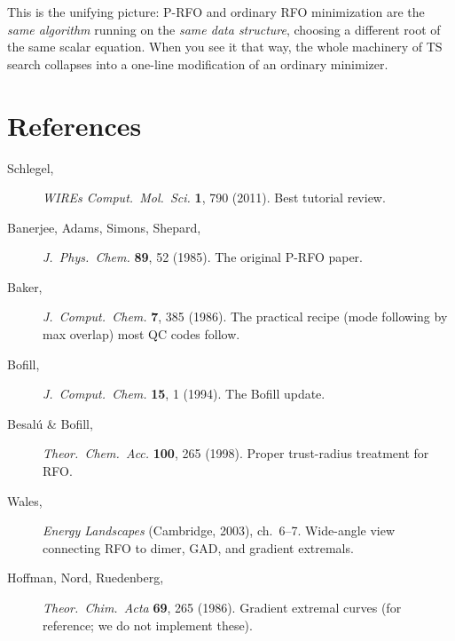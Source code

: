 \documentclass[11pt]{article}
\begin{document}
This is the unifying picture: P-RFO and ordinary RFO minimization are the
\emph{same algorithm} running on the \emph{same data structure}, choosing a
different root of the same scalar equation.  When you see it that way, the
whole machinery of TS search collapses into a one-line modification of an
ordinary minimizer.

\section*{References}

\begin{description}
\item[Schlegel,] \emph{WIREs Comput.\ Mol.\ Sci.} \textbf{1}, 790 (2011).
      Best tutorial review.
\item[Banerjee, Adams, Simons, Shepard,] \emph{J.\ Phys.\ Chem.} \textbf{89},
      52 (1985).  The original P-RFO paper.
\item[Baker,] \emph{J.\ Comput.\ Chem.} \textbf{7}, 385 (1986).  The
      practical recipe (mode following by max overlap) most QC codes follow.
\item[Bofill,] \emph{J.\ Comput.\ Chem.} \textbf{15}, 1 (1994).  The Bofill
      update.
\item[Besal\'u \& Bofill,] \emph{Theor.\ Chem.\ Acc.} \textbf{100}, 265
      (1998).  Proper trust-radius treatment for RFO.
\item[Wales,] \emph{Energy Landscapes} (Cambridge, 2003), ch.\ 6--7.
      Wide-angle view connecting RFO to dimer, GAD, and gradient extremals.
\item[Hoffman, Nord, Ruedenberg,] \emph{Theor.\ Chim.\ Acta} \textbf{69}, 265
      (1986).  Gradient extremal curves (for reference; we do not implement
      these).
\end{description}
\end{document}

